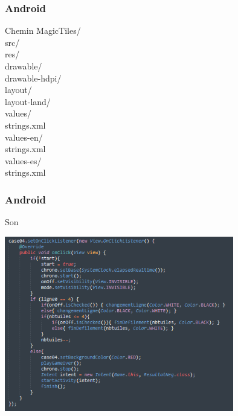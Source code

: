 \documentclass{beamer}
\begin{document}
\begin{frame}
\frametitle{Android}


\begin{block}{Chemin}
   MagicTiles/ \\
	  \parindent=1cm {src/} \\
	   \parindent=1cm {res/} \\
                 \parindent=2cm {drawable/} \\
                 \parindent=2cm {drawable-hdpi/} \\
                 \parindent=2cm {layout/} \\
                 \parindent=2cm {layout-land/} \\
          \parindent=2cm { {\color {blue}values/} } \\
                 \parindent=3cm {{\color {red}strings.xml}}\\
          \parindent=2cm {{\color {blue}values-en/}} \\
                 \parindent=3cm {{\color {red}strings.xml}} \\
          \parindent=2cm {{\color {blue}values-es/}} \\
                 \parindent=3cm {{\color {red}strings.xml}} \\
\end{block}
  
\end{frame}

\begin{frame}
\frametitle{Android}
\begin{block}{Son}

      \includegraphics[width=100mm]{Capture1}
      

\end{block}

\end{frame}
\end{document}

